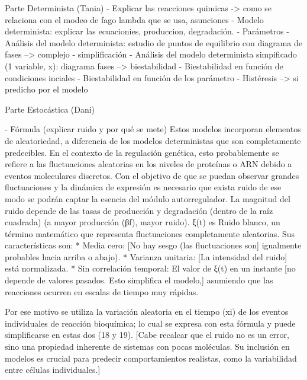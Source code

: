 Parte Determinista (Tania)
- Explicar las reacciones quimicas -> como se relaciona con el modeo de fago lambda que se usa, asunciones
- Modelo determinista: explicar las ecuacionies, produccion, degradación.
- Parámetros
- Análisis del modelo determinista: estudio de puntos de equilibrio con diagrama de fases --> complejo - simplificación
- Análisis del modelo determinista simpificado (1 variable, x): diagrama fases --> biestabilidad
- Biestabilidad en función de condiciones inciales
- Biestabilidad en función de los parámetro
- Histéresis --> si predicho por el modelo

Parte Estocástica (Dani)

- Fórmula (explicar ruido y por qué se mete)
Estos modelos incorporan elementos de aleatoriedad, a diferencia de los modelos deterministas que son completamente predecibles. En el contexto de la regulación genética, esto probablemente se refiere a las fluctuaciones aleatorias en los niveles de proteínas o ARN debido a eventos moleculares discretos. 
Con el objetivo de que se puedan observar grandes fluctuaciones y la dinámica de expresión es necesario que exista ruido de ese modo se podrán captar la esencia del módulo autorregulador.
La magnitud del ruido depende de las tasas de producción y degradación (dentro de la raíz cuadrada) (a mayor producción (βf), mayor ruido).
ξ(t) es Ruido blanco, un término matemático que representa fluctuaciones completamente aleatorias. Sus características son: 
* Media cero: [No hay sesgo (las fluctuaciones son] igualmente probables hacia arriba o abajo). 
* Varianza unitaria: [La intensidad del ruido] está normalizada. 
* Sin correlación temporal: El valor de ξ(t) en un instante [no depende de valores pasados. Esto simplifica el modelo,] asumiendo que las reacciones ocurren en escalas de tiempo muy rápidas.

Por ese motivo se utiliza la variación aleatoria en el tiempo (xi) de los eventos individuales de reacción bioquímica; lo cual se expresa con esta fórmula y puede simplificarse en estas dos (18 y 19).
[Cabe recalcar que el ruido no es un error, sino una propiedad inherente de sistemas con pocas moléculas. Su inclusión en modelos es crucial para predecir comportamientos realistas, como la variabilidad entre células individuales.]


